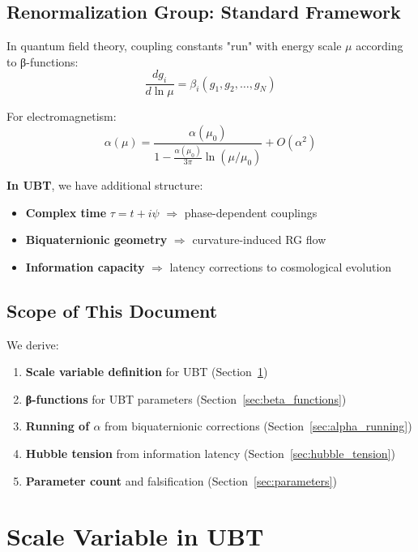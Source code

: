 \documentclass[12pt]{article}
\begin{document}
\subsection{Renormalization Group: Standard Framework}

In quantum field theory, coupling constants "run" with energy scale $\mu$ according to β-functions:
\begin{equation}
\frac{d g_i}{d \ln \mu} = \beta_i(g_1, g_2, \ldots, g_N)
\end{equation}

For electromagnetism:
\begin{equation}
\alpha(\mu) = \frac{\alpha(\mu_0)}{1 - \frac{\alpha(\mu_0)}{3\pi} \ln(\mu/\mu_0)} + O(\alpha^2)
\end{equation}

\textbf{In UBT}, we have additional structure:
\begin{itemize}
    \item \textbf{Complex time} $\tau = t + i\psi$ $\Rightarrow$ phase-dependent couplings
    \item \textbf{Biquaternionic geometry} $\Rightarrow$ curvature-induced RG flow
    \item \textbf{Information capacity} $\Rightarrow$ latency corrections to cosmological evolution
\end{itemize}

\subsection{Scope of This Document}

We derive:
\begin{enumerate}
    \item \textbf{Scale variable definition} for UBT (Section~\ref{sec:scale_variable})
    \item \textbf{β-functions} for UBT parameters (Section~\ref{sec:beta_functions})
    \item \textbf{Running of $\alpha$} from biquaternionic corrections (Section~\ref{sec:alpha_running})
    \item \textbf{Hubble tension} from information latency (Section~\ref{sec:hubble_tension})
    \item \textbf{Parameter count} and falsification (Section~\ref{sec:parameters})
\end{enumerate}

\section{Scale Variable in UBT}
\label{sec:scale_variable}
\end{document}
